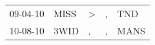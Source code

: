 \begin{supertabular}{p{0.07\textwidth}p{0.06\textwidth}p{0.02\textwidth}p{0.02\textwidth}p{0.06\textwidth}}
 09-04-10\textsuperscript{} &  MISS\textsuperscript{} &  \textgreater &  , &   TND\textsuperscript{} \\
 10-08-10\textsuperscript{} &  3WID\textsuperscript{} &             , &  , &  MANS\textsuperscript{} \\
\end{supertabular}
